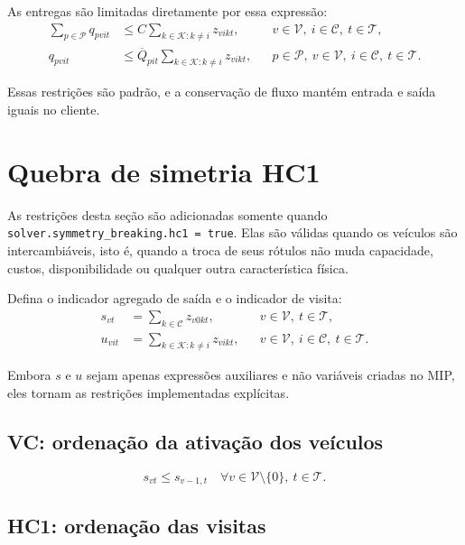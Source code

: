 \documentclass[11pt,a4paper]{article}
\newcommand{\set}[1]{\mathcal{#1}}
\begin{document}
As entregas são limitadas diretamente por essa expressão:
\begin{align}
  \sum_{p\in\set{P}}q_{pvit}
  &\le C\sum_{k\in\set{K}:k\ne i}z_{vikt},
  &&v\in\set{V},\ i\in\set{C},\ t\in\set{T},
  \label{eq:z-visit-capacity}\\
  q_{pvit}
  &\le \overline Q_{pit}\sum_{k\in\set{K}:k\ne i}z_{vikt},
  &&p\in\set{P},\ v\in\set{V},\ i\in\set{C},\ t\in\set{T}.
  \label{eq:z-visit-product-capacity}
\end{align}

Essas restrições são padrão, e a conservação de fluxo mantém entrada e saída
iguais no cliente.

\section{Quebra de simetria HC1}

As restrições desta seção são adicionadas somente quando
\texttt{solver.symmetry\_breaking.hc1 = true}. Elas são válidas quando os
veículos são intercambiáveis, isto é, quando a troca de seus rótulos não muda
capacidade, custos, disponibilidade ou qualquer outra característica física.

Defina o indicador agregado de saída e o indicador de visita:
\begin{align}
  s_{vt} &= \sum_{k\in\set{C}}z_{v0kt},
  && v\in\set{V},\ t\in\set{T}, \label{eq:vehicle-active}\\
  u_{vit} &= \sum_{k\in\set{K}:k\ne i}z_{vikt},
  && v\in\set{V},\ i\in\set{C},\ t\in\set{T}.
  \label{eq:customer-visit}
\end{align}

Embora $s$ e $u$ sejam apenas expressões auxiliares e não variáveis criadas
no MIP, eles tornam as restrições implementadas explícitas.

\subsection{VC: ordenação da ativação dos veículos}

\begin{equation}
  s_{vt}\le s_{v-1,t}
  \quad \forall v\in\set{V}\setminus\{0\},\ t\in\set{T}.
  \label{eq:VC}
\end{equation}

\subsection{HC1: ordenação das visitas}
\end{document}
